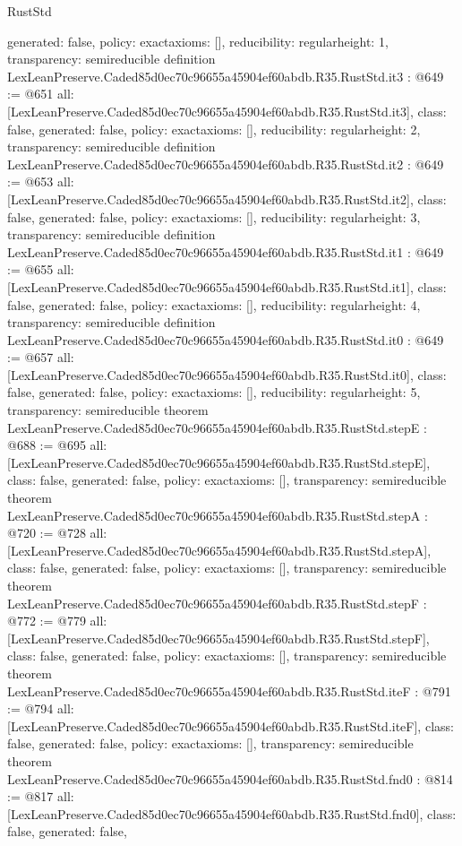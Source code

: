 \begin{lexlean}{RustStd}
\begin{coremodule}
{  generated: false,
  policy: exact{axioms: []},
  reducibility: regular{height: 1},
  transparency: semireducible
}
definition LexLeanPreserve.Caded85d0ec70c96655a45904ef60abdb.R35.RustStd.it3 : @649 := @651 {
  all: [LexLeanPreserve.Caded85d0ec70c96655a45904ef60abdb.R35.RustStd.it3],
  class: false,
  generated: false,
  policy: exact{axioms: []},
  reducibility: regular{height: 2},
  transparency: semireducible
}
definition LexLeanPreserve.Caded85d0ec70c96655a45904ef60abdb.R35.RustStd.it2 : @649 := @653 {
  all: [LexLeanPreserve.Caded85d0ec70c96655a45904ef60abdb.R35.RustStd.it2],
  class: false,
  generated: false,
  policy: exact{axioms: []},
  reducibility: regular{height: 3},
  transparency: semireducible
}
definition LexLeanPreserve.Caded85d0ec70c96655a45904ef60abdb.R35.RustStd.it1 : @649 := @655 {
  all: [LexLeanPreserve.Caded85d0ec70c96655a45904ef60abdb.R35.RustStd.it1],
  class: false,
  generated: false,
  policy: exact{axioms: []},
  reducibility: regular{height: 4},
  transparency: semireducible
}
definition LexLeanPreserve.Caded85d0ec70c96655a45904ef60abdb.R35.RustStd.it0 : @649 := @657 {
  all: [LexLeanPreserve.Caded85d0ec70c96655a45904ef60abdb.R35.RustStd.it0],
  class: false,
  generated: false,
  policy: exact{axioms: []},
  reducibility: regular{height: 5},
  transparency: semireducible
}
theorem LexLeanPreserve.Caded85d0ec70c96655a45904ef60abdb.R35.RustStd.stepE : @688 := @695 {
  all: [LexLeanPreserve.Caded85d0ec70c96655a45904ef60abdb.R35.RustStd.stepE],
  class: false,
  generated: false,
  policy: exact{axioms: []},
  transparency: semireducible
}
theorem LexLeanPreserve.Caded85d0ec70c96655a45904ef60abdb.R35.RustStd.stepA : @720 := @728 {
  all: [LexLeanPreserve.Caded85d0ec70c96655a45904ef60abdb.R35.RustStd.stepA],
  class: false,
  generated: false,
  policy: exact{axioms: []},
  transparency: semireducible
}
theorem LexLeanPreserve.Caded85d0ec70c96655a45904ef60abdb.R35.RustStd.stepF : @772 := @779 {
  all: [LexLeanPreserve.Caded85d0ec70c96655a45904ef60abdb.R35.RustStd.stepF],
  class: false,
  generated: false,
  policy: exact{axioms: []},
  transparency: semireducible
}
theorem LexLeanPreserve.Caded85d0ec70c96655a45904ef60abdb.R35.RustStd.iteF : @791 := @794 {
  all: [LexLeanPreserve.Caded85d0ec70c96655a45904ef60abdb.R35.RustStd.iteF],
  class: false,
  generated: false,
  policy: exact{axioms: []},
  transparency: semireducible
}
theorem LexLeanPreserve.Caded85d0ec70c96655a45904ef60abdb.R35.RustStd.fnd0 : @814 := @817 {
  all: [LexLeanPreserve.Caded85d0ec70c96655a45904ef60abdb.R35.RustStd.fnd0],
  class: false,
  generated: false,
}
\end{coremodule}
\end{lexlean}

